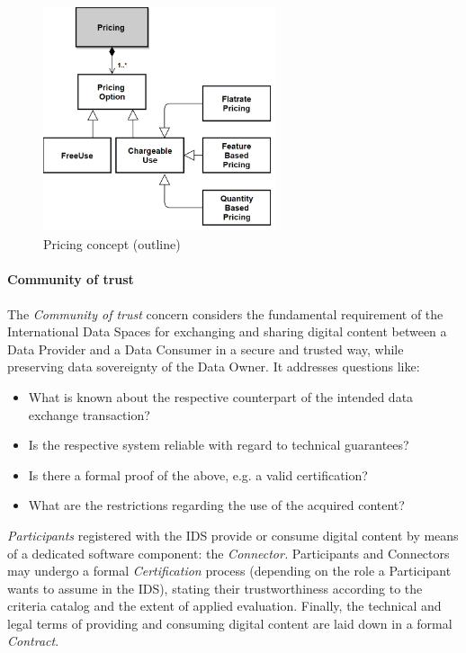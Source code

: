 
\begin{figure}[H]
	\begin{Center}
		\includegraphics[width=2.7in,height=2.6in]{./media/image47.png}
		\caption{Pricing concept (outline)}
		\label{fig:Pricing_concept_outline}
	\end{Center}
\end{figure}





\paragraph{Community of trust\\}
The \textit{Community of trust} concern considers the fundamental requirement of the International Data Spaces for exchanging and sharing digital content between a Data Provider and a Data Consumer in a secure and trusted way, while preserving data sovereignty of the Data Owner. It addresses questions like: 
 \begin{itemize}
	\item What is known about the respective counterpart of the intended data exchange transaction? 
 	\item Is the respective system reliable with regard to technical guarantees? 
 	\item Is there a formal proof of the above, e.g. a valid certification? 
 	\item What are the restrictions regarding the use of the acquired content?
\end{itemize} 
 \textit{Participants }registered with the IDS provide or consume digital content by means of a dedicated software component: the \textit{Connector. }Participants and Connectors may undergo a formal \textit{Certification }process (depending on the role a Participant wants to assume in the IDS), stating their trustworthiness according to the criteria catalog and the extent of applied evaluation. Finally, the technical and legal terms of providing and consuming digital content are laid down in a formal \textit{Contract}.


